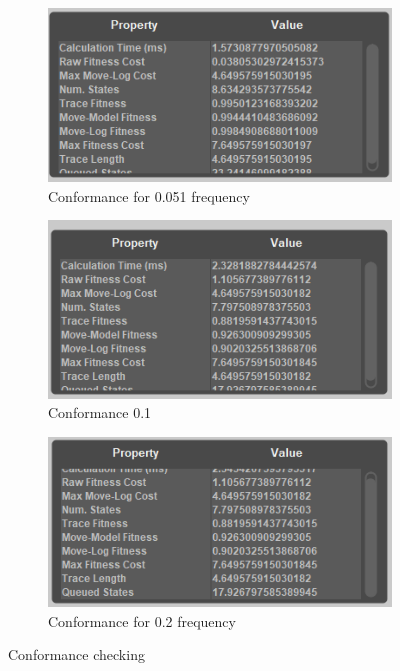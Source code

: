 \begin{figure}[!htbp]
\centering
\begin{subfigure}{.25\textwidth}
  \centering
  \includegraphics[width=\linewidth]{App_Conformance0-051.PNG}
  \caption{Conformance for 0.051 frequency}
  \label{fig:APP_Conf0-051}
\end{subfigure}%
\begin{subfigure}{.25\textwidth}
  \centering
  \includegraphics[width=\linewidth]{App_Conformance0-1.PNG}
  \caption{Conformance 0.1}
  \label{fig:APP_Conf0-1}
\end{subfigure}
\begin{subfigure}{.25\textwidth}
  \centering
  \includegraphics[width=\linewidth]{App_Conformance0-2.PNG}
  \caption{Conformance for 0.2 frequency}
  \label{fig:APP_Conf0-2}
\end{subfigure}
\caption{Conformance checking}
\label{fig:App_Conf}
\end{figure}

